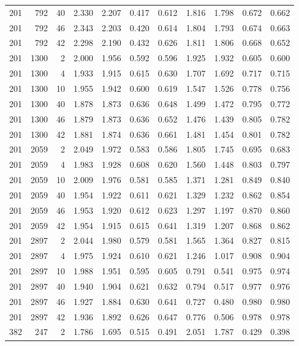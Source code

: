 \documentclass[journal=jacsat,manuscript=article]{achemso}
\begin{document}
\begin{table}
\begin{tabular}{rrr|rrrr|rrrr}
201 & 792 & 40 & 2.330 & 2.207 & 0.417 & 0.612 & 1.816 & 1.798 & 0.672 & 0.662\\
201 & 792 & 46 & 2.343 & 2.203 & 0.420 & 0.614 & 1.804 & 1.793 & 0.674 & 0.663\\
201 & 792 & 42 & 2.298 & 2.190 & 0.432 & 0.626 & 1.811 & 1.806 & 0.668 & 0.652\\
201 & 1300 & 2 & 2.000 & 1.956 & 0.592 & 0.596 & 1.925 & 1.932 & 0.605 & 0.600\\
201 & 1300 & 4 & 1.933 & 1.915 & 0.615 & 0.630 & 1.707 & 1.692 & 0.717 & 0.715\\
201 & 1300 & 10 & 1.955 & 1.942 & 0.600 & 0.619 & 1.547 & 1.526 & 0.778 & 0.756\\
201 & 1300 & 40 & 1.878 & 1.873 & 0.636 & 0.648 & 1.499 & 1.472 & 0.795 & 0.772\\
201 & 1300 & 46 & 1.879 & 1.873 & 0.636 & 0.652 & 1.476 & 1.439 & 0.805 & 0.782\\
201 & 1300 & 42 & 1.881 & 1.874 & 0.636 & 0.661 & 1.481 & 1.454 & 0.801 & 0.782\\
201 & 2059 & 2 & 2.049 & 1.972 & 0.583 & 0.586 & 1.805 & 1.745 & 0.695 & 0.683\\
201 & 2059 & 4 & 1.983 & 1.928 & 0.608 & 0.620 & 1.560 & 1.448 & 0.803 & 0.797\\
201 & 2059 & 10 & 2.009 & 1.976 & 0.581 & 0.585 & 1.371 & 1.281 & 0.849 & 0.840\\
201 & 2059 & 40 & 1.954 & 1.922 & 0.611 & 0.621 & 1.329 & 1.232 & 0.862 & 0.854\\
201 & 2059 & 46 & 1.953 & 1.920 & 0.612 & 0.623 & 1.297 & 1.197 & 0.870 & 0.860\\
201 & 2059 & 42 & 1.954 & 1.915 & 0.615 & 0.641 & 1.319 & 1.207 & 0.868 & 0.862\\
201 & 2897 & 2 & 2.044 & 1.980 & 0.579 & 0.581 & 1.565 & 1.364 & 0.827 & 0.815\\
201 & 2897 & 4 & 1.975 & 1.924 & 0.610 & 0.621 & 1.246 & 1.017 & 0.908 & 0.904\\
201 & 2897 & 10 & 1.988 & 1.951 & 0.595 & 0.605 & 0.791 & 0.541 & 0.975 & 0.974\\
201 & 2897 & 40 & 1.940 & 1.904 & 0.621 & 0.632 & 0.794 & 0.517 & 0.977 & 0.976\\
201 & 2897 & 46 & 1.927 & 1.884 & 0.630 & 0.641 & 0.727 & 0.480 & 0.980 & 0.980\\
201 & 2897 & 42 & 1.936 & 1.892 & 0.626 & 0.647 & 0.776 & 0.506 & 0.978 & 0.978\\
382 & 247 & 2 & 1.786 & 1.695 & 0.515 & 0.491 & 2.051 & 1.787 & 0.429 & 0.398\\

\end{tabular}
\end{table}
\end{document}
